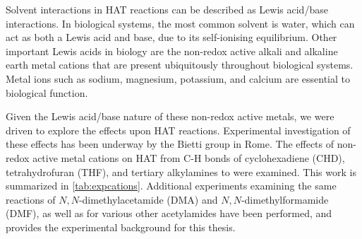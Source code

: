 Solvent interactions in HAT reactions can be described as Lewis acid/base interactions. In biological systems, the most common solvent is water, which can act as both a Lewis acid and base, due to its self-ionising equilibrium. Other important Lewis acids in biology are the non-redox active alkali and alkaline earth metal cations that are present ubiquitously throughout biological systems. Metal ions such as sodium, magnesium, potassium, and calcium are essential to biological function.\cite{Karp2013} 

Given the Lewis acid/base nature of these non-redox active metals, we were driven to explore the effects upon HAT reactions. Experimental investigation of these effects has been underway by the Bietti group in Rome. The effects of non-redox active metal cations on HAT from C-H bonds of cyclohexadiene (CHD), tetrahydrofuran (THF), and tertiary alkylamines to \cumo were examined.\cite{Salamone2013} This work is summarized in \ref{tab:expcations}. Additional experiments examining the same reactions of $N,N$-dimethylacetamide (DMA) and $N,N$-dimethylformamide (DMF)\cite{Salamone2015}, as well as for various other acetylamides\cite{Salamone2016} have been performed, and provides the experimental background for this thesis.

